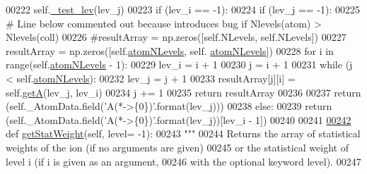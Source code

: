\begin{DoxyCode}
00222         self.\hyperlink{classpyneb_1_1core_1_1pynebcore_1_1___atom_data_fits_ae83c63a7bd651275de23e5f17ddcf999}{\_test\_lev}(lev\_j)
00223         \textcolor{keywordflow}{if} (lev\_i == -1):
00224             \textcolor{keywordflow}{if} (lev\_j == -1):
00225                 \textcolor{comment}{# Line below commented out because introduces bug if Nlevels(atom) > Nlevels(coll)}
00226                 \textcolor{comment}{#resultArray = np.zeros([self.NLevels, self.NLevels])}
00227                 resultArray = np.zeros([self.\hyperlink{classpyneb_1_1core_1_1pynebcore_1_1___atom_data_fits_a4ff73bfa251e1139692c2a60f9821315}{atomNLevels}, self.
      \hyperlink{classpyneb_1_1core_1_1pynebcore_1_1___atom_data_fits_a4ff73bfa251e1139692c2a60f9821315}{atomNLevels}])
00228                 \textcolor{keywordflow}{for} i \textcolor{keywordflow}{in} range(self.\hyperlink{classpyneb_1_1core_1_1pynebcore_1_1___atom_data_fits_a4ff73bfa251e1139692c2a60f9821315}{atomNLevels} - 1):
00229                     lev\_i = i + 1
00230                     j = i + 1
00231                     \textcolor{keywordflow}{while} (j < self.\hyperlink{classpyneb_1_1core_1_1pynebcore_1_1___atom_data_fits_a4ff73bfa251e1139692c2a60f9821315}{atomNLevels}):
00232                         lev\_j = j + 1
00233                         resultArray[j][i] = self.\hyperlink{classpyneb_1_1core_1_1pynebcore_1_1___atom_data_fits_a4ecca5287d3b6bf0d6e44b9bb184db77}{getA}(lev\_j, lev\_i)
00234                         j += 1
00235                 \textcolor{keywordflow}{return} resultArray
00236 
00237             \textcolor{keywordflow}{return} (self.\_AtomData.field(\textcolor{stringliteral}{'A(*->\{0\})'}.format(lev\_j)))
00238         \textcolor{keywordflow}{else}:
00239             \textcolor{keywordflow}{return} (self.\_AtomData.field(\textcolor{stringliteral}{'A(*->\{0\})'}.format(lev\_j))[lev\_i - 1])
00240 
00241 
\hypertarget{pynebcore_8py_source_l00242}{}\hyperlink{classpyneb_1_1core_1_1pynebcore_1_1___atom_data_fits_ad0edb5ef48a2f1acdb0d02890aeeb4b6}{00242}     \textcolor{keyword}{def }\hyperlink{classpyneb_1_1core_1_1pynebcore_1_1___atom_data_fits_ad0edb5ef48a2f1acdb0d02890aeeb4b6}{getStatWeight}(self, level= -1):
00243         \textcolor{stringliteral}{"""}
00244 \textcolor{stringliteral}{        Returns the array of statistical weights of the ion (if no arguments are given) }
00245 \textcolor{stringliteral}{            or the statistical weight of level i (if i is given as an argument, }
00246 \textcolor{stringliteral}{            with the optional keyword level).}
00247 \textcolor{stringliteral}{            }

\end{DoxyCode}
